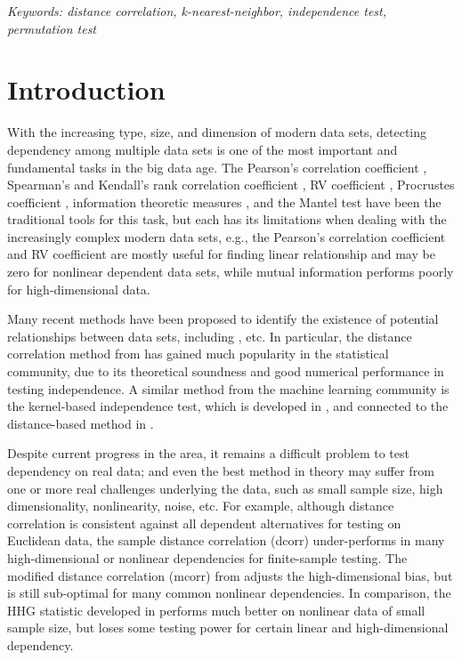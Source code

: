 \documentclass[11pt]{article}
\begin{document}
\noindent%
{\it Keywords: distance correlation, k-nearest-neighbor, independence test, permutation test}  
\vfill

\clearpage
\tableofcontents


\newpage
{}

\section{Introduction}
With the increasing type, size, and dimension of modern data sets, detecting dependency among multiple data sets is one of the most important and fundamental tasks in the big data age. The Pearson's correlation coefficient \cite{Pearson1895}, Spearman's and Kendall's rank correlation coefficient \cite{KendallBook}, RV coefficient \cite{RobertEscoufier1976}, Procrustes coefficient \cite{GowerProcrustesBook}, information theoretic measures \cite{Renyi1959}, and the Mantel test \cite{Mantel1967} have been the traditional tools for this task, but each has its limitations when dealing with the increasingly complex modern data sets, e.g., the Pearson's correlation coefficient and RV coefficient are mostly useful for finding linear relationship and may be zero for nonlinear dependent data sets, while mutual information performs poorly for high-dimensional data. 

Many recent methods have been proposed to identify the existence of potential relationships between data sets, including \cite{Baringhaus2004,TaskinenOjaRandles2005, GrettonEtAl2005, SzekelyRizzoBakirov2007, GrettonGyorfi2010,Reshef2011, HellerGorfine2013, Reimherr2013, SzekelyRizzo2013a, SzekelyRizzo2013b}, etc. In particular, the distance correlation method from \cite{SzekelyRizzoBakirov2007, SzekelyRizzo2009, SzekelyRizzo2013a, SzekelyRizzo2014} has gained much popularity in the statistical community, due to its theoretical soundness and good numerical performance in testing independence. A similar method from the machine learning community is the kernel-based independence test, which is developed in \cite{GrettonEtAl2005, GrettonGyorfi2010, GrettonEtAl2012}, and connected to the distance-based method in \cite{SejdinovicEtAl2013}.

Despite  current progress in the area, it remains a difficult problem to test dependency on real data; and even the best method in theory may suffer from one or more real challenges underlying the data, such as small sample size, high dimensionality, nonlinearity, noise, etc. For example, although distance correlation is consistent against all dependent alternatives for testing on Euclidean data, the sample distance correlation (dcorr) under-performs in many high-dimensional or nonlinear dependencies for finite-sample testing. The modified distance correlation (mcorr) from \cite{SzekelyRizzo2013a} adjusts the high-dimensional bias, but is still sub-optimal for many common nonlinear dependencies. In comparison, the HHG statistic developed in \cite{HellerGorfine2013} performs much better on nonlinear data of small sample size, but  loses some testing power for certain linear and high-dimensional dependency.
\end{document}
